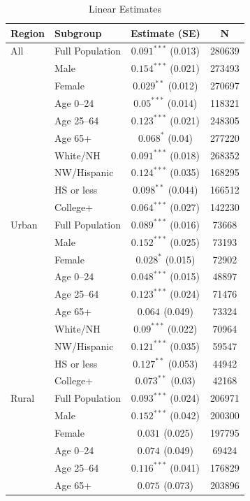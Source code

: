 \documentclass[12pt, a4paper]{article}
\begin{document}
\begin{table}[H]
\centering
\caption{Linear Estimates}
\label{tab:lin_reg_summary}
\begin{tabular}{llcc}
\toprule
\textbf{Region} & \textbf{Subgroup} & \textbf{Estimate (SE)} & \textbf{N} \\
\midrule
All & Full Population & $0.091^{***}$ (0.013) & 280639 \\
 & Male & $0.154^{***}$ (0.021) & 273493 \\
 & Female & $0.029^{**}$ (0.012) & 270697 \\
 & Age 0--24 & $0.05^{***}$ (0.014) & 118321 \\
 & Age 25--64 & $0.123^{***}$ (0.021) & 248305 \\
 & Age 65+ & $0.068^{*}$ (0.04) & 277220 \\
 & White/NH & $0.091^{***}$ (0.018) & 268352 \\
 & NW/Hispanic & $0.124^{***}$ (0.035) & 168295 \\
 & HS or less & $0.098^{**}$ (0.044) & 166512 \\
 & College+ & $0.064^{***}$ (0.027) & 142230 \\
Urban & Full Population & $0.089^{***}$ (0.016) & 73668 \\
 & Male & $0.152^{***}$ (0.025) & 73193 \\
 & Female & $0.028^{*}$ (0.015) & 72902 \\
 & Age 0--24 & $0.048^{***}$ (0.015) & 48897 \\
 & Age 25--64 & $0.123^{***}$ (0.024) & 71476 \\
 & Age 65+ & $0.064^{}$ (0.049) & 73324 \\
 & White/NH & $0.09^{***}$ (0.022) & 70964 \\
 & NW/Hispanic & $0.121^{***}$ (0.035) & 59547 \\
 & HS or less & $0.127^{**}$ (0.053) & 44942 \\
 & College+ & $0.073^{**}$ (0.03) & 42168 \\
Rural & Full Population & $0.093^{***}$ (0.024) & 206971 \\
 & Male & $0.152^{***}$ (0.042) & 200300 \\
 & Female & $0.031^{}$ (0.025) & 197795 \\
 & Age 0--24 & $0.074^{}$ (0.049) & 69424 \\
 & Age 25--64 & $0.116^{***}$ (0.041) & 176829 \\
 & Age 65+ & $0.075^{}$ (0.073) & 203896 \\

\end{tabular}
\end{table}
\end{document}
